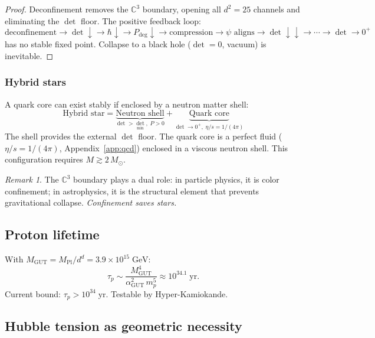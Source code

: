 \documentclass[12pt]{article}
\theoremstyle{remark}
\newtheorem{remark}[theorem]{Remark}
\theoremstyle{definition}
\begin{document}
\begin{proof}
Deconfinement removes the $\mathbb{C}^3$ boundary, opening all $d^2 = 25$ channels and eliminating the $\det$ floor. The positive feedback loop:
\begin{equation}
\text{deconfinement} \to \det\!\downarrow \to \hbar\!\downarrow \to P_\text{deg}\!\downarrow \to \text{compression} \to \psi\text{ aligns} \to \det\!\downarrow\!\downarrow \to \cdots \to \det \to 0^+
\end{equation}
has no stable fixed point. Collapse to a black hole ($\det = 0$, vacuum) is inevitable.
\end{proof}

\subsubsection{Hybrid stars}

A quark core can exist stably if enclosed by a neutron matter shell:
\begin{equation}
\text{Hybrid star} = \underbrace{\text{Neutron shell}}_{\det > \det_\text{min},\; P > 0} + \underbrace{\text{Quark core}}_{\det \to 0^+,\;\eta/s = 1/(4\pi)}
\end{equation}
The shell provides the external $\det$ floor. The quark core is a perfect fluid ($\eta/s = 1/(4\pi)$, Appendix~\ref{app:qcd}) enclosed in a viscous neutron shell. This configuration requires $M \gtrsim 2\,M_\odot$.

\begin{remark}
The $\mathbb{C}^3$ boundary plays a dual role: in particle physics, it is color confinement; in astrophysics, it is the structural element that prevents gravitational collapse. \emph{Confinement saves stars.}
\end{remark}

\subsection{Proton lifetime}

With $M_\text{GUT} = M_\text{Pl}/d^d = 3.9 \times 10^{15}\;\text{GeV}$:
\begin{equation}
\tau_p \sim \frac{M_\text{GUT}^4}{\alpha_\text{GUT}^2\,m_p^5} \approx 10^{34.1}\;\text{yr}.
\end{equation}
Current bound: $\tau_p > 10^{34}\;\text{yr}$. Testable by Hyper-Kamiokande.

\subsection{Hubble tension as geometric necessity}
\end{document}
